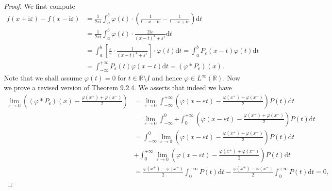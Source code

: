 \begin{proof}
We first compute 
$$
\begin{aligned}
f\left( x+\mathrm{i}\varepsilon \right) -f\left( x-\mathrm{i}\varepsilon \right) &=\frac{1}{2\pi \mathrm{i}}\int_a^b{\varphi \left( t \right) \cdot \left( \frac{1}{t-x-\mathrm{i}\varepsilon}-\frac{1}{t-x+\mathrm{i}\varepsilon} \right) \mathrm{d}t}
\\
&=\frac{1}{2\pi \mathrm{i}}\int_a^b{\varphi \left( t \right) \cdot \frac{2\mathrm{i}\varepsilon}{\left( x-t \right) ^2+\varepsilon ^2}\mathrm{d}t}
\\
&=\int_a^b{\left[ \frac{\varepsilon}{\pi}\cdot \frac{1}{\left( x-t \right) ^2+\varepsilon ^2} \right] \cdot \varphi \left( t \right) \mathrm{d}t}=\int_a^b{P_{\varepsilon}\left( x-t \right) \varphi \left( t \right) \mathrm{d}t}
\\
&=\int_{-\infty}^{+\infty}{P_{\varepsilon}\left( t \right) \varphi \left( x-t \right) \mathrm{d}t}=\left( \varphi *P_{\varepsilon} \right) \left( x \right) .
\end{aligned}
$$
Note that we shall assume $\varphi(t)=0$ for $t\in\mathbb{R}\setminus I$ and hence $\varphi\in L^\infty(\mathbb{R})$. Now we prove a revised version of Theorem 9.2.4. We asserts that indeed we have 
$$
\begin{aligned}
\lim_{\varepsilon \rightarrow 0} \left( \left( \varphi *P_{\varepsilon} \right) \left( x \right) -\frac{\varphi \left( x^+ \right) +\varphi \left( x^- \right)}{2} \right) &=\lim_{\varepsilon \rightarrow 0} \int_{-\infty}^{+\infty}{\left( \varphi \left( x-\varepsilon t \right) -\frac{\varphi \left( x^+ \right) +\varphi \left( x^- \right)}{2} \right) P\left( t \right) \mathrm{d}t}
\\
&=\lim_{\varepsilon \rightarrow 0} \int_{-\infty}^0{+\int_0^{+\infty}{\left( \varphi \left( x-\varepsilon t \right) -\frac{\varphi \left( x^+ \right) +\varphi \left( x^- \right)}{2} \right) P\left( t \right) \mathrm{d}t}}
\\
&=\int_{-\infty}^0{\lim_{\varepsilon \rightarrow 0} \left( \varphi \left( x-\varepsilon t \right) -\frac{\varphi \left( x^+ \right) +\varphi \left( x^- \right)}{2} \right) P\left( t \right) \mathrm{d}t}
\\
&+\int_0^{+\infty}{\lim_{\varepsilon \rightarrow 0} \left( \varphi \left( x-\varepsilon t \right) -\frac{\varphi \left( x^+ \right) +\varphi \left( x^- \right)}{2} \right) P\left( t \right) \mathrm{d}t}
\\
&=\frac{\varphi \left( x^+ \right) -\varphi \left( x^- \right)}{2}\int_0^{+\infty}{P\left( t \right) \mathrm{d}t}-\frac{\varphi \left( x^+ \right) -\varphi \left( x^- \right)}{2}\int_0^{+\infty}{P\left( t \right) \mathrm{d}t}=0,

\end{aligned}$$
\end{proof}
